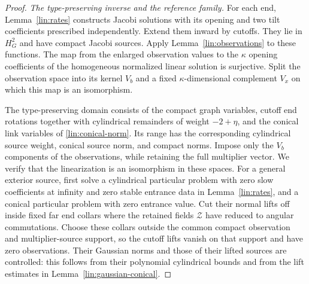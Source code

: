 \begin{proof}
\emph{The type-preserving inverse and the reference family.}
For each end, Lemma~\ref{lin:rates} constructs Jacobi solutions with
its opening and two tilt coefficients prescribed independently.
Extend them inward by cutoffs.  They lie in $H^2_G$ and have compact
Jacobi sources.  Apply Lemma~\ref{lin:observations} to these functions.
The map from the enlarged observation values to the $\kappa$ opening
coefficients of the homogeneous normalized linear solution is surjective.
Split the observation space into its kernel $V_b$ and a fixed
$\kappa$-dimensional complement $V_x$ on which this map is an isomorphism.

The type-preserving domain consists of the compact graph variables,
cutoff end rotations together with cylindrical remainders of weight
$-2+\eta$, and the conical link variables of
\eqref{lin:conical-norm}.  Its range has the corresponding cylindrical
source weight, conical source norm, and compact norms.  Impose only
the $V_b$ components of the observations, while retaining the full
multiplier vector.  We verify that the linearization is an isomorphism
in these spaces.  For a general exterior source, first solve a cylindrical
particular problem with zero slow coefficients at infinity and zero stable
entrance data in Lemma~\ref{lin:rates}, and a conical particular problem
with zero entrance value.  Cut their normal lifts off inside fixed far end
collars where the retained fields $\mathcal Z$ have reduced to angular
commutations.  Choose these collars outside the common compact observation
and multiplier-source support, so the cutoff lifts vanish on that support
and have zero observations.  Their Gaussian norms and those of their lifted sources are
controlled: this follows from their polynomial cylindrical bounds and
from the lift estimates in Lemma~\ref{lin:gaussian-conical}.


\end{proof}

